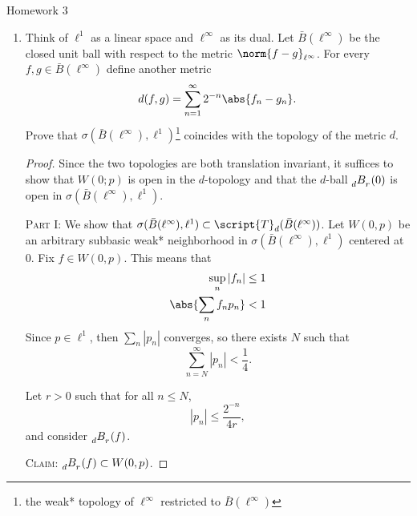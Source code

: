 \documentclass[12pt,letterpaper]{article}
\begin{document}
\pagestyle{fancy}
\begin{center}
{\Large Homework 3}%
\end{center}

\renewcommand{\B}{\bar{B}(\ell^\infty)}
\begin{enumerate}
\item %
Think of $\ell^1$ as a linear space and $\ell^{\infty}$ as its dual. Let $\B$ be the closed unit ball with respect to the metric $\norm{f-g}_{\ell^\infty}$. For every $f,g\in \B$ define another metric 
$$d(f,g)=\sum_{n=1}^\infty 2^{-n}\abs{f_n-g_n}.$$
Prove that $\sigma(\B,\ell^1)$\footnote{the weak* topology of $\ell^\infty$ restricted to $\B$} coincides with the topology of the metric $d$. 

\newcommand{\dballzero}[1]{\tensor[_d]{B}{_{#1}}(0)}
\newcommand{\dballf}[1]{\tensor[_d]{B}{_{#1}}(f)}
\begin{proof}
Since the two topologies are both translation invariant, it suffices to show that $W(0;p)$ is open in the $d$-topology and that the $d$-ball $\dballzero{r}$ is open in $\sigma(\B,\ell^1)$. 

\textsc{Part I}: We show that $\sigma(\B,\ell^1)\subset\script{T}_d(\B)$. 
	Let $W(0,p)$ be an arbitrary subbasic weak* neighborhood in $\sigma(\B,\ell^1)$ centered at 0. 
	Fix $f\in W(0,p)$. This means that 
		\begin{align*}
		\sup_n |f_n|&\leq 1 \\
		\abs{\sum_n f_np_n} &<1
		\end{align*}				
	Since $p\in\ell^1$, then $\sum_n|p_n|$ converges, so there exists $N$ such that 
	\begin{equation}
	\sum_{n=N}^\infty |p_n| < \frac{1}{4}.
	\end{equation}
	
	Let $r>0$ such that for all $n\leq N$,
	\begin{equation}
	|p_n|\leq\frac{2^{-n}}{4r},
	\end{equation}
	and consider $\dballf{r}$. 
		
		\textsc{Claim:} $\dballf{r}\subset W(0,p)$. %
		

\end{proof}
\end{enumerate}
\end{document}
